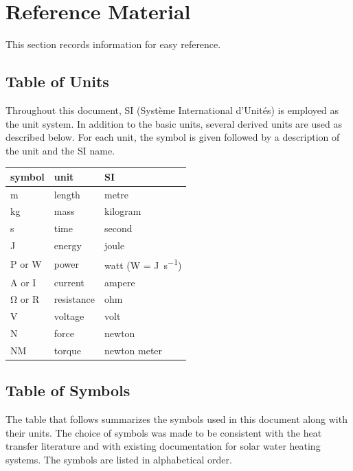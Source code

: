 \documentclass[12pt]{article}
\begin{document}
\newpage


\tableofcontents
\listoftables
\listoffigures

\newpage
{}
\section{Reference Material}

This section records information for easy reference.

\subsection{Table of Units}

Throughout this document, SI (Syst\`{e}me International d'Unit\'{e}s) is employed
as the unit system.  In addition to the basic units, several derived units are
used as described below.  For each unit, the symbol is given followed by a
description of the unit and the SI name.
~\newline

\renewcommand{\arraystretch}{1.2}
\begin{table}[ht]
  \noindent \begin{tabular}{l l l} 
    \toprule		
    \textbf{symbol} & \textbf{unit} & \textbf{SI}\\
    \midrule 
    \si{\metre} & length & metre\\
    \si{\kilogram} & mass	& kilogram\\
    \si{\second} & time & second\\
    \si{\joule} & energy & joule\\
    P or \si{\watt} & power & watt (W = \si{\joule\per\second})\\
    \si{\ampere} or I& current & ampere\\
    \si{\ohm} or R& resistance & ohm\\
    \si{\volt} & voltage & volt\\
    \si{\newton} & force & newton\\
    \si{\newton}M & torque & newton meter\\
    \bottomrule
  \end{tabular}
\end{table}

\subsection{Table of Symbols}

The table that follows summarizes the symbols used in this document along with
their units.  The choice of symbols was made to be consistent with the heat
transfer literature and with existing documentation for solar water heating
systems.  The symbols are listed in alphabetical order.
\end{document}
